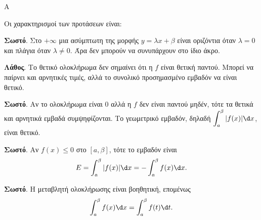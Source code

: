 \begin{thema}{Α}
\begin{erwthma}
\item {}

\item {}

\item {}

\item Οι χαρακτηρισμοί των προτάσεων είναι:
\begin{alist}
\item \textbf{Σωστό}. Στο $+\infty$ μια ασύμπτωτη της μορφής $y=\lambda x+\beta$ είναι οριζόντια όταν $\lambda=0$ και πλάγια όταν $\lambda\neq0$. Άρα δεν μπορούν να συνυπάρχουν στο ίδιο άκρο.
\item \textbf{Λάθος}. Το θετικό ολοκλήρωμα δεν σημαίνει ότι η $f$ είναι θετική παντού. Μπορεί να παίρνει και αρνητικές τιμές, αλλά το συνολικό προσημασμένο εμβαδόν να είναι θετικό.
\item \textbf{Σωστό}. Αν το ολοκλήρωμα είναι $0$ αλλά η $f$ δεν είναι παντού μηδέν, τότε τα θετικά και αρνητικά εμβαδά συμψηφίζονται. Το γεωμετρικό εμβαδόν, δηλαδή $\dint_a^\beta |f(x)|\d x$, είναι θετικό.
\item \textbf{Σωστό}. Αν $f(x)\le0$ στο $[a,\beta]$, τότε το εμβαδόν είναι
\[ E=\dint_a^\beta |f(x)|\d x=-\dint_a^\beta f(x)\d x. \]
\item \textbf{Σωστό}. Η μεταβλητή ολοκλήρωσης είναι βοηθητική, επομένως
\[ \dint_a^\beta f(x)\d x=\dint_a^\beta f(t)\d t. \]
\end{alist}
\end{erwthma}
\end{thema}

